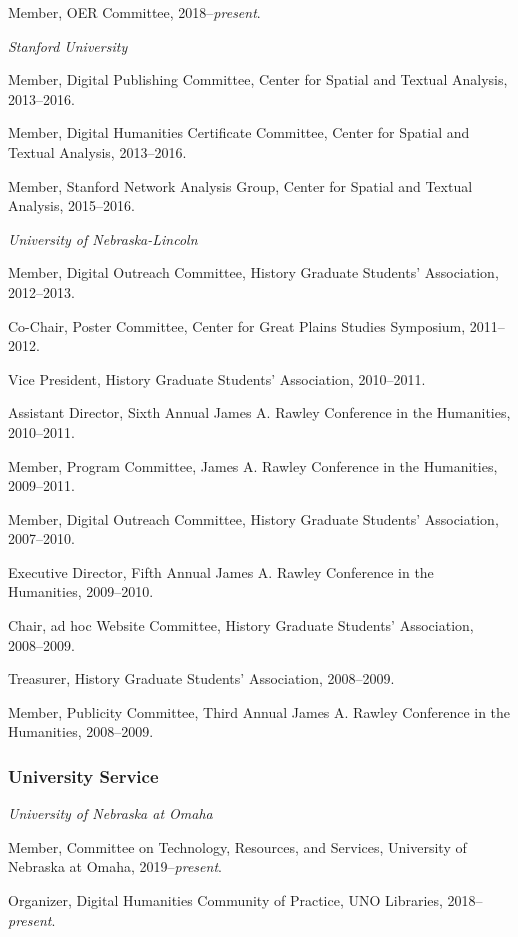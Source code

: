Member, OER Committee, 2018--\emph{present}.

\vspace{.4cm}

\emph{Stanford University}

Member, Digital Publishing Committee, Center for Spatial and Textual
Analysis, 2013--2016.

Member, Digital Humanities Certificate Committee, Center for Spatial and
Textual Analysis, 2013--2016.

Member, Stanford Network Analysis Group, Center for Spatial and Textual
Analysis, 2015--2016.

\vspace{.4cm}

\emph{University of Nebraska-Lincoln}

Member, Digital Outreach Committee, History Graduate Students'
Association, 2012--2013.

Co-Chair, Poster Committee, Center for Great Plains Studies Symposium,
2011--2012.

Vice President, History Graduate Students' Association, 2010--2011.

Assistant Director, Sixth Annual James A. Rawley Conference in the
Humanities, 2010--2011.

Member, Program Committee, James A. Rawley Conference in the Humanities,
2009--2011.

Member, Digital Outreach Committee, History Graduate Students'
Association, 2007--2010.

Executive Director, Fifth Annual James A. Rawley Conference in the
Humanities, 2009--2010.

Chair, ad hoc Website Committee, History Graduate Students' Association,
2008--2009.

Treasurer, History Graduate Students' Association, 2008--2009.

Member, Publicity Committee, Third Annual James A. Rawley Conference in
the Humanities, 2008--2009.

\subsubsection{University Service}\label{university-service}

\emph{University of Nebraska at Omaha}

Member, Committee on Technology, Resources, and Services, University of
Nebraska at Omaha, 2019--\emph{present}.

Organizer, Digital Humanities Community of Practice, UNO Libraries,
2018--\emph{present}.

